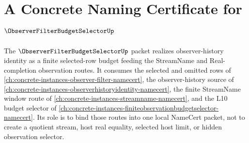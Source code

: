 \chapter{A Concrete Naming Certificate for $\ObserverFilterBudgetSelectorUp$}
\label{ch:concrete-instances-observer-filter-budget-selector-namecert}

The $\ObserverFilterBudgetSelectorUp$ packet realizes observer-history identity as a finite selected-row budget feeding the StreamName and Real-completion observation routes. It consumes the selected and omitted rows of \autoref{ch:concrete-instances-observer-filter-namecert}, the observer-history source of \autoref{ch:concrete-instances-observerhistoryidentity-namecert}, the finite StreamName window route of \autoref{ch:concrete-instances-streamname-namecert}, and the L10 budget selector of \autoref{ch:concrete-instances-finiteobservationbudgetselector-namecert}. Its role is to bind those routes into one local NameCert packet, not to create a quotient stream, host real equality, selected host limit, or hidden observation selector.



